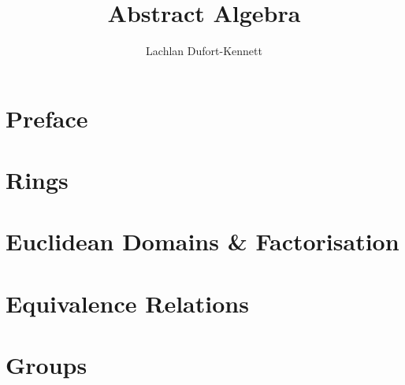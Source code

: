 \documentclass{lecture-notes}
\title{Abstract Algebra}
\author{Lachlan Dufort-Kennett}
\begin{document}
    \frontmatter
    \maketitle
    \tableofcontents

    \chapter{Preface}

    \mainmatter
    \chapter{Rings}
    
    \chapter{Euclidean Domains \& Factorisation}
    
    \chapter{Equivalence Relations}
    
    \chapter{Groups}
    

    \backmatter
    \nocite{*}
    
    
\end{document}
